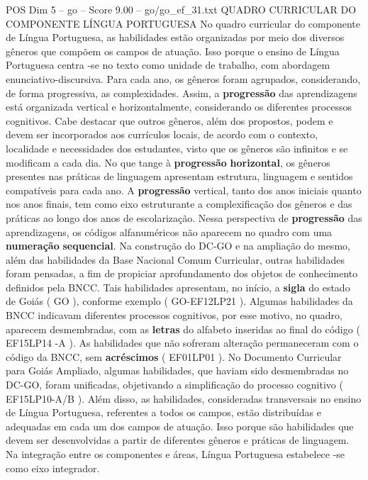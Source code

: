 \begin{textsample}{POS Dim 5 – go – Score 9.00 – go/go\_ef\_31.txt}  \label{ex:f5_pos_006}
QUADRO CURRICULAR DO COMPONENTE LÍNGUA PORTUGUESA No quadro curricular do componente de Língua Portuguesa, as habilidades estão organizadas por meio dos diversos gêneros que compõem os campos de atuação.
Isso porque o ensino de Língua Portuguesa centra -se no texto como unidade de trabalho, com abordagem enunciativo-discursiva.
Para cada ano, os gêneros foram agrupados, considerando, de forma progressiva, as complexidades.
Assim, a \textbf{progressão} das aprendizagens está organizada vertical e horizontalmente, considerando os diferentes processos cognitivos.
Cabe destacar que outros gêneros, além dos propostos, podem e devem ser incorporados aos currículos locais, de acordo com o contexto, localidade e necessidades dos estudantes, visto que os gêneros são infinitos e se modificam a cada dia.
No que tange à \textbf{progressão} \textbf{horizontal}, os gêneros presentes nas práticas de linguagem apresentam estrutura, linguagem e sentidos compatíveis para cada ano.
A \textbf{progressão} vertical, tanto dos anos iniciais quanto nos anos finais, tem como eixo estruturante a complexificação dos gêneros e das práticas ao longo dos anos de escolarização.
Nessa perspectiva de \textbf{progressão} das aprendizagens, os códigos alfanuméricos não aparecem no quadro com uma \textbf{numeração} \textbf{sequencial}.
Na construção do DC-GO e na ampliação do mesmo, além das habilidades da Base Nacional Comum Curricular, outras habilidades foram pensadas, a fim de propiciar aprofundamento dos objetos de conhecimento definidos pela BNCC.
Tais habilidades apresentam, no início, a \textbf{sigla} do estado de Goiás ( GO ), conforme exemplo ( GO-EF12LP21 ).
Algumas habilidades da BNCC indicavam diferentes processos cognitivos, por esse motivo, no quadro, aparecem desmembradas, com as \textbf{letras} do alfabeto inseridas ao final do código ( EF15LP14 -A ).
As habilidades que não sofreram alteração permaneceram com o código da BNCC, sem \textbf{acréscimos} ( EF01LP01 ).
No Documento Curricular para Goiás Ampliado, algumas habilidades, que haviam sido desmembradas no DC-GO, foram unificadas, objetivando a simplificação do processo cognitivo ( EF15LP10-A/B ).
Além disso, as habilidades, consideradas transversais no ensino de Língua Portuguesa, referentes a todos os campos, estão distribuídas e adequadas em cada um dos campos de atuação.
Isso porque são habilidades que devem ser desenvolvidas a partir de diferentes gêneros e práticas de linguagem.
Na integração entre os componentes e áreas, Língua Portuguesa estabelece -se como eixo integrador.

\end{textsample}

